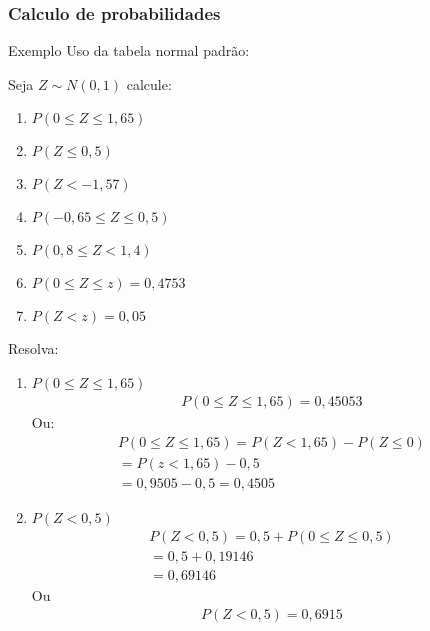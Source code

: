 \documentclass[11pt,a4paper]{book}
\begin{document}
  \subsubsection{Calculo de probabilidades}
  \begin{description}
    \item {Exemplo} Uso da tabela normal padrão:

      Seja $Z\sim N(0,1)$ calcule:
      \begin{enumerate}
        \item $P(0 \leq Z \leq 1,65)$
        \item $P(Z \leq 0,5)$
        \item $P(Z < -1,57)$
        \item $P(-0,65 \leq Z \leq 0,5)$
        \item $P(0,8 \leq Z < 1,4)$
        \item $P(0 \leq Z \leq z)=0,4753$
        \item $P(Z < z)=0,05$
      \end{enumerate}
      
      Resolva:
      \begin{enumerate}
        \item $P(0 \leq Z \leq 1,65)$
        \begin{align*}          P(0 \leq Z \leq 1,65)= 0,45053 \end{align*}
          Ou:
          \begin{align*}
          P(0 \leq Z \leq 1,65)= P(Z < 1,65)-P(Z \leq 0) \\
          = P(z < 1,65)- 0,5 \\
          = 0,9505 - 0,5 = 0,4505
        \end{align*}
      \item $P(Z < 0,5)$
        \begin{align*}
          P(Z < 0,5)= 0,5 + P(0 \leq Z \leq 0,5) \\
          = 0,5 + 0,19146 \\
          = 0,69146
      \end{align*}
      Ou 
      \begin{align*}
        P(Z <0,5) = 0,6915
      \end{align*}


\end{enumerate}
\end{description}
\end{document}

